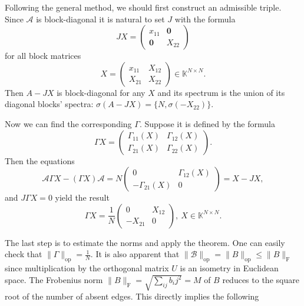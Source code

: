 \documentclass[a4paper]{jpconf}
\begin{document}
Following the general method,
    we should first construct an admissible triple.
Since \( \mathcal{A} \) is block-diagonal
    it is natural to set \( J \) with the formula
    \[
        JX =
        \left(\begin{array}{c|c}
            x_{11} & \mathbf{0} \\ \hline
            \mathbf{0} & X_{22}
        \end{array}\right)
    \]
    for all block matrices
    \[
        X =
        \left(\begin{array}{c|c}
            x_{11} & X_{12} \\ \hline
            X_{21} & X_{22}
        \end{array}\right)\in\mathbb{K}^{N{\times}N}.
    \]
Then \( A - JX \) is block-diagonal for any \( X \)
    and its spectrum is the union
    of its diagonal blocks' spectra:
    \( \sigma(A - JX) = \{N, \sigma(-X_{22}) \} \).

Now we can find the corresponding \( \Gamma \).
Suppose it is defined by the formula
    \[ \Gamma X = \begin{pmatrix}
        \Gamma_{11}(X) & \Gamma_{12}(X) \\
        \Gamma_{21}(X) & \Gamma_{22}(X)
        \end{pmatrix}.
    \]
Then the equations
    \[
        \mathcal{A} \Gamma X - (\Gamma X)\mathcal{A} =
        N
        \begin{pmatrix}
          0 & \Gamma_{12}(X) \\
          -\Gamma_{21}(X) & 0
        \end{pmatrix} = X - JX,
     \]
and \( J\Gamma X = 0 \) yield the result
    \[
        \Gamma X = \frac{1}{N} \begin{pmatrix} 0 & X_{12} \\ -X_{21} & 0 \end{pmatrix},\ X\in\mathbb{K}^{N{\times}N}.
    \]

The last step is to estimate the norms and apply the theorem.
One can easily check that \( \|\Gamma\|_{\mathrm{op}} = \frac1N \).
It is also apparent that \( \|\mathcal{B}\|_{\mathrm{op}} = \|B\|_{\mathrm{op}} \leq \|B\|_{\mathrm{F}} \)
    since multiplication by the orthogonal matrix \( U \)
    is an isometry in Euclidean space.
The Frobenius norm \( {\|B\|_{\mathrm{F}} = \sqrt{\sum_{ij} b_ij^2} = M} \)
    of \( B \)
    reduces to the square root of the number of absent edges.
This directly implies the following
\end{document}
